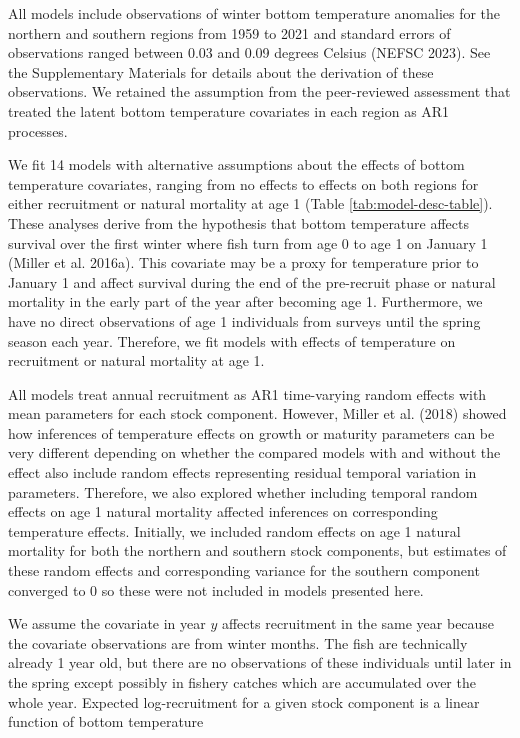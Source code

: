 \documentclass[
]{article}
\begin{document}
All models include observations of winter bottom temperature anomalies for the northern and southern regions from 1959 to 2021 and standard errors of observations ranged between 0.03 and 0.09 degrees Celsius (NEFSC 2023). See the Supplementary Materials for details about the derivation of these observations. We retained the assumption from the peer-reviewed assessment that treated the latent bottom temperature covariates in each region as AR1 processes.

We fit 14 models with alternative assumptions about the effects of bottom temperature covariates, ranging from no effects to effects on both regions for either recruitment or natural mortality at age 1 (Table \ref{tab:model-desc-table}). These analyses derive from the hypothesis that bottom temperature affects survival over the first winter where fish turn from age 0 to age 1 on January 1 (Miller et al. 2016a). This covariate may be a proxy for temperature prior to January 1 and affect survival during the end of the pre-recruit phase or natural mortality in the early part of the year after becoming age 1. Furthermore, we have no direct observations of age 1 individuals from surveys until the spring season each year. Therefore, we fit models with effects of temperature on recruitment or natural mortality at age 1.

All models treat annual recruitment as AR1 time-varying random effects with mean parameters for each stock component. However, Miller et al. (2018) showed how inferences of temperature effects on growth or maturity parameters can be very different depending on whether the compared models with and without the effect also include random effects representing residual temporal variation in parameters. Therefore, we also explored whether including temporal random effects on age 1 natural mortality affected inferences on corresponding temperature effects. Initially, we included random effects on age 1 natural mortality for both the northern and southern stock components, but estimates of these random effects and corresponding variance for the southern component converged to 0 so these were not included in models presented here.

We assume the covariate in year \(y\) affects recruitment in the same year because the covariate observations are from winter months. The fish are technically already 1 year old, but there are no observations of these individuals until later in the spring except possibly in fishery catches which are accumulated over the whole year. Expected log-recruitment for a given stock component is a linear function of bottom temperature
\end{document}
